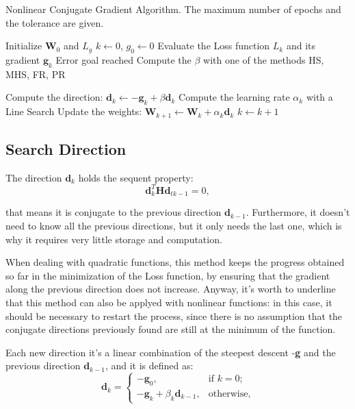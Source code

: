 		\begin{algorithm}[H]
			\caption{Nonlinear Conjugate Gradient Algorithm. The maximum number of epochs and the tolerance are given.}
			\label{alg:cgd}
			\begin{algorithmic}[1]
					\State Initialize $\textbf{W}_0$ and $\textit{L}_g$
					\State $k \gets 0$, $g_0 \gets 0$
						\State Evaluate the Loss function $\textit{L}_k$ and its gradient $\textbf{g}_k$
							\State
							\Return Error goal reached
						\EndIf
						\State Compute the $\beta$ with one of the methods HS, MHS, FR, PR

						\State Compute the direction: $\textbf{d}_k \gets - \textbf{g}_k + \beta\textbf{d}_k$
						\State Compute the learning rate $\alpha_k$ with a Line Search
						\State Update the weights: $\textbf{W}_{k+1} \gets \textbf{W}_{k} + \alpha_k\textbf{d}_k$
						\State $k \gets k + 1$
					\EndWhile
				\EndProcedure
			\end{algorithmic}
		\end{algorithm}


		\subsection{Search Direction}
		\label{sub:search_direction}
			The direction $\textbf{d}_k$ holds the sequent property:
			\begin{equation}
			\textbf{d}_k^T\textbf{H}\textbf{d}_{tk-1} = 0,
			\end{equation}

		 	that means it is conjugate to the previous direction $\textbf{d}_{k-1}$. Furthermore, it doesn't need to know all the 	previous directions, but it only needs the last one, which is why it requires very little storage and computation.

			When dealing with quadratic functions, this method keeps the progress obtained so far in the minimization of the Loss function, by ensuring that the gradient along the previous direction does not increase.
			Anyway, it's worth to underline that this method can also be applyed with nonlinear functions: in this case, it should be necessary to restart the process, since there is no assumption that the conjugate directions previously found are still at the minimum of the function.

			Each new direction it's a linear combination of the steepest descent -\textbf{g} and the previous direction $\textbf{d}_{k-1}$, and it is defined as:
			\begin{equation}
			\label{dir}
			  \textbf{d}_k=\begin{cases}
			    -\textbf{g}_0, & \text{if $k=0$};\\
			    -\textbf{g}_k + \beta_k\textbf{d}_{k-1}, & \text{otherwise,}
			  \end{cases}
			\end{equation}

